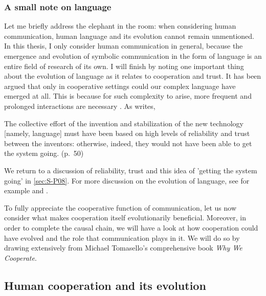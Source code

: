 
\subsubsection{A small note on language}

Let me briefly address the elephant in the room: when considering human communication, human language and its evolution cannot remain unmentioned. In this thesis, I only consider human communication in general, because the emergence and evolution of symbolic communication in the form of language is an entire field of research of its own.
I will finish by noting one important thing about the evolution of language as it relates to cooperation and trust. It has been argued that only in cooperative settings could our complex language have emerged at all. This is because for such complexity to arise, more frequent and prolonged interactions are necessary \citep{Benitez21}. As \citet{Dor17} writes,
\begin{quoting}
    The collective effort of the invention and stabilization of the new technology [namely, language] must have been based on high levels of reliability and trust between the inventors: otherwise, indeed, they would not have been able to get the system going.
    \hfill (p.~50)
\end{quoting}
We return to a discussion of reliability, trust and this idea of 'getting the system going' in \cref{sec:S-P08}. For more discussion on the evolution of language, see for example \citet{Tomasello08} and \citet{Dor17}.

To fully appreciate the cooperative function of communication, let us now consider what makes cooperation itself evolutionarily beneficial. Moreover, in order to complete the causal chain, we will have a look at how cooperation could have evolved and the role that communication plays in it. We will do so by drawing extensively from Michael Tomasello's comprehensive \citeyear{Tomasello09} book \emph{Why We Cooperate}.

\subsection{Human cooperation and its evolution}
\label{sec:comm:cooperation}

